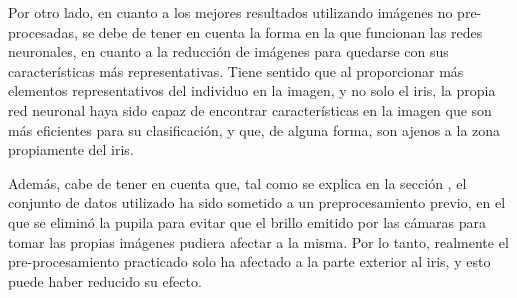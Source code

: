 Por otro lado, en cuanto a los mejores resultados utilizando imágenes no pre-procesadas, se debe de tener en cuenta la forma en la que funcionan las redes neuronales,
en cuanto a la reducción de imágenes para quedarse con sus características más representativas. Tiene sentido que al proporcionar más elementos representativos del individuo en la imagen,
y no solo el iris, la propia red neuronal haya sido capaz de encontrar características en la imagen que son más eficientes para su clasificación, y que, de alguna forma, son
ajenos a la zona propiamente del iris.

Además, cabe de tener en cuenta que, tal como se explica en la sección , el conjunto de datos utilizado ha sido sometido a un preprocesamiento previo, en el que se eliminó la pupila 
para evitar que el brillo emitido por las cámaras para tomar las propias imágenes pudiera afectar a la misma. Por lo tanto, realmente el pre-procesamiento practicado solo ha afectado a la 
parte exterior al iris, y esto puede haber reducido su efecto.

